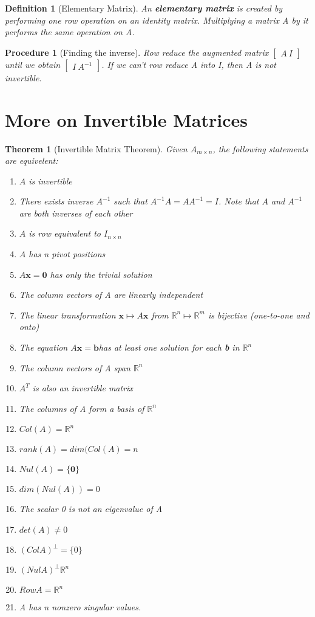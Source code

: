 \documentclass[12pt]{report}
\newtheorem{thm}{Theorem}
\newtheorem{dfn}{Definition}
\newtheorem{proc}{Procedure}
\newcommand{\mtx}[3]{$#1_{#2\times #3}$}
\newcommand{\mateq}{$A\bm{x}=\bm{b}$}
\begin{document}
\begin{dfn}[Elementary Matrix]
An \textbf{elementary matrix} is created by performing one row operation on an identity matrix. Multiplying a matrix A by it performs the same operation on A.
\end{dfn}

\begin{proc}[Finding the inverse]
Row reduce the augmented matrix $\begin{bmatrix}A \: I \end{bmatrix}$ until we obtain $\begin{bmatrix}I \: A^{-1} \end{bmatrix}$. If we can't row reduce A into I, then A is not invertible.
\end{proc}

\section{More on Invertible Matrices}

\begin{thm}[Invertible Matrix Theorem]
Given \mtx{A}{m}{n}, the following statements are equivelent:

\begin{enumerate}
\item $A$ is invertible
\item There exists inverse $A^{-1}$ such that $A^{-1}A=AA^{-1}=I$. Note that $A$ and $A^{-1}$ are both inverses of each other
\item $A$ is row equivalent to \mtx{I}{n}{n}
\item $A$ has n pivot positions
\item $A\bm{x}=\bm{0}$ has only the trivial solution
\item The column vectors of A are linearly independent
\item The linear transformation $\bm{x} \mapsto A\bm{x}$ from $\mathbb{R}^n \mapsto \mathbb{R}^m$ is bijective (one-to-one and onto)
\item The equation \mateq has at least one solution for each \textbf{b} in $\mathbb{R}^n$
\item The column vectors of A span $\mathbb{R}^n$
\item $A^T$ is also an invertible matrix
\item The columns of A form a basis of $\mathbb{R}^n$
\item $Col(A)=\mathbb{R}^n$
\item $rank(A)=dim(Col(A)=n$
\item $Nul(A)=\{\bm{0}\}$
\item $dim(Nul(A))=0$
\item The scalar 0 is not an eigenvalue of A
\item $det(A) \neq 0$
\item $(Col A)^{\perp}=\{0\}$
\item $(Nul A)^{\perp}\mathbb{R}^n$
\item $Row A = \mathbb{R}^n$
\item A has n nonzero singular values.

\end{enumerate}
\end{thm}
\end{document}
